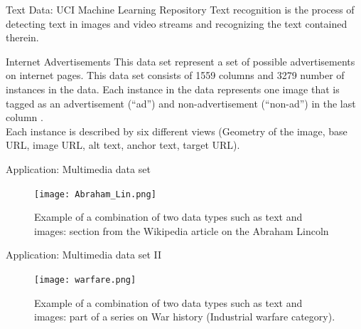 \documentclass[compress,sky blue]{beamer}
\begin{document}
\begin{frame}{Text Data: UCI Machine Learning Repository}
\vspace{-0.6cm}	
Text recognition is the process of detecting text in images and video streams and recognizing the text contained therein. 

\begin{exampleblock}{Internet Advertisements }
 This data set represent a set of possible advertisements on internet pages. This data set consists of \alert{1559} columns and \alert{3279} number of instances in the data. Each instance in the data represents one image that is tagged as an advertisement (“ad”) and non-advertisement (“non-ad”) in the last column \cite{27C.L.Blake1998UCISets}. \\
 Each instance is described by \alert{six} different views (Geometry of the image, base URL, image URL, alt text, anchor text, target URL). 
\end{exampleblock}


\end{frame}

\begin{frame}{Application: Multimedia data set }

\begin{figure}
\texttt{[image: Abraham\_Lin.png]}
\caption{\label{fig:your-figure} Example of a combination of two data types such as text and images:  section from the Wikipedia article on the Abraham Lincoln}
\end{figure}

\end{frame}

\begin{frame}{Application: Multimedia data set II}

\begin{figure}
\texttt{[image: warfare.png]}
\caption{\label{fig:your-figure} Example of a combination of two data types such as text and images:  part of a series 
on War history (Industrial warfare category).
}
\end{figure}

\end{frame}
\end{document}
